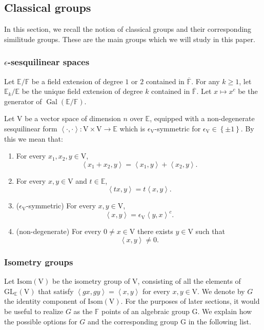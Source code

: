 \documentclass[12pt, reqno]{amsart}
\theoremstyle{definition}
\theoremstyle{definition}
\theoremstyle{definition}
\newcommand{\hermitianSpace}{\mathrm{V}}
\newcommand{\innerproduct}[2]{\left\langle #1,#2\right\rangle}
\newcommand{\involution}[1]{#1^{c}}
\newcommand{\GL}{\mathrm{GL}}
\newcommand{\finiteField}{\mathbb{F}}
\newcommand{\quadraticExtension}{\mathbb{E}}
\newcommand{\quadraticFieldExtension}[1]{\quadraticExtension_{#1}}
\newcommand{\algebraicClosure}[1]{\overline{#1}}
\newcommand{\Galois}{\operatorname{Gal}}
\newcommand{\IsometryGroup}{\mathrm{Isom}}
\newcommand{\algebraicGroup}[1]{\boldsymbol{\mathrm{#1}}}
\begin{document}
\subsection{Classical groups}

In this section, we recall the notion of classical groups and their corresponding similitude groups. These are the main groups which we will study in this paper.

\subsubsection{$\epsilon$-sesquilinear spaces}
Let $\quadraticExtension \slash \finiteField$ be a field extension of degree $1$ or $2$ contained in $\algebraicClosure{\finiteField}$. For any $k \ge 1$, let $\quadraticFieldExtension{k} \slash \quadraticExtension$ be the unique field extension of degree $k$ contained in $\algebraicClosure{\finiteField}$. Let $x \mapsto \involution{x}$ be the generator of $\Galois\left(\quadraticExtension \slash \finiteField\right)$.

Let $\hermitianSpace$ be a vector space of dimension $n$ over $\quadraticExtension$, equipped with a non-degenerate sesquilinear form $\innerproduct{\cdot}{\cdot} \colon \hermitianSpace \times \hermitianSpace \to \quadraticExtension$ which is $\epsilon_{\hermitianSpace}$-symmetric for $\epsilon_{\hermitianSpace} \in \left\{\pm 1\right\}$. By this we mean that:
\begin{enumerate}
	\item For every $x_1,x_2,y \in \hermitianSpace$, $$\innerproduct{x_1 + x_2}{y} = \innerproduct{x_1}{y} + \innerproduct{x_2}{y}.$$
	\item For every $x,y \in \hermitianSpace$ and $t \in \quadraticExtension$, $$\innerproduct{tx}{y} = t\innerproduct{x}{y}.$$
	\item ($\epsilon_{\hermitianSpace}$-symmetric) For every $x,y \in \hermitianSpace$, $$\innerproduct{x}{y} = \epsilon_{\hermitianSpace} \involution{\innerproduct{y}{x}}.$$
	\item (non-degenerate) For every $0 \ne x \in \hermitianSpace$ there exists $y \in \hermitianSpace$ such that $$\innerproduct{x}{y} \ne 0.$$
\end{enumerate}

\subsubsection{Isometry groups}\label{subsec:isometry-groups}
Let $\IsometryGroup \left(\hermitianSpace\right)$ be the isometry group of $\hermitianSpace$, consisting of all the elements of $\GL_{\quadraticExtension}\left(\hermitianSpace\right)$ that satisfy $\innerproduct{gx}{gy} = \innerproduct{x}{y}$ for every $x,y \in \hermitianSpace$. We denote by $G$ the identity component of $\IsometryGroup\left(\hermitianSpace\right)$. For the purposes of later sections, it would be useful to realize $G$ as the $\finiteField$ points of an algebraic group $\algebraicGroup{G}$. We explain how the possible options for $G$ and the corresponding group $\algebraicGroup{G}$ in the following list.
\end{document}
